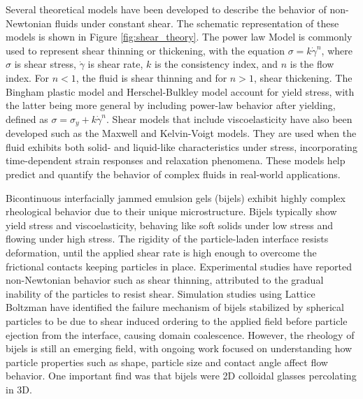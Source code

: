 Several theoretical models have been developed to describe the behavior of non-Newtonian fluids under constant shear. The schematic representation of these models is shown in
Figure \ref{fig:shear_theory}. The power law Model is commonly used to represent shear thinning or 
thickening, with the equation \(\sigma = k \dot{\gamma}^n\), where \(\sigma\) is shear stress, \(\dot{\gamma}\) is shear rate, \(k\) is the consistency index, and \(n\) is the flow index.
\cite{mezger_rheology_2020}
For \(n<1\), the fluid is shear thinning and for \(n>1\), shear thickening. \cite{mezger_rheology_2020}
The Bingham plastic model and Herschel-Bulkley model account for yield stress, with the latter being more general by 
including power-law behavior after yielding, defined as $\sigma = \sigma_y + k \dot{\gamma}^n$. \cite{mezger_rheology_2020}
Shear models that include viscoelasticity have also been developed such as the  Maxwell and Kelvin-Voigt 
models. \cite{mezger_rheology_2020}
They are used when the fluid exhibits both solid- and liquid-like characteristics under stress, incorporating time-dependent strain responses and relaxation phenomena. These models help 
predict and quantify the behavior of complex fluids in real-world applications. \cite{mezger_rheology_2020}

Bicontinuous interfacially jammed emulsion gels (bijels) exhibit highly complex rheological behavior due to their unique microstructure. Bijels typically show yield stress and viscoelasticity, 
behaving like soft solids under low stress and flowing under high stress. \cite{macmillan_rheological_2019, bai_dynamics_2015, lee_making_2013}  The rigidity of the 
particle-laden interface resists deformation, until the applied shear rate is high enough to overcome the frictional contacts keeping particles in place. \cite{boakye-ansah_controlling_2020} 
Experimental studies have reported non-Newtonian behavior such as shear thinning, attributed to the gradual inability of the particles to resist shear. \cite{macmillan_rheological_2019}
Simulation studies using Lattice Boltzman have identified the failure mechanism of bijels stabilized by spherical particles to be due to shear induced ordering to the applied field before
particle ejection from the interface, causing domain coalescence. \cite{bonaccorso_shear_2020} However, the rheology of bijels is still an emerging field, 
with ongoing work focused on understanding how particle properties such as shape, particle size and contact angle affect flow behavior. One important find was that bijels were 
2D colloidal glasses percolating in 3D. \cite{ching_bijel_2022}

